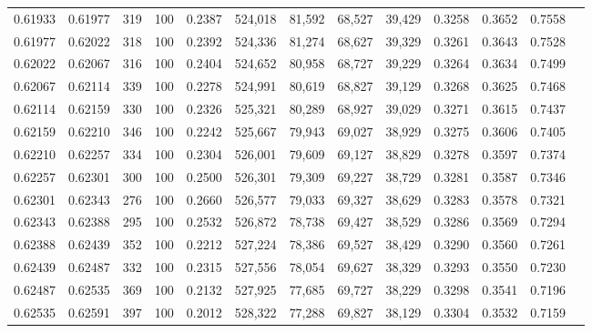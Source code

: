 \begin{tabular}{rrrrrrrrrrrrr}
0.61933 & 0.61977 &   319 & 100 &                                     0.2387 & 524,018 &  81,592 &  68,527 &  39,429 & 0.3258 & 0.3652 & 0.7558 \\
0.61977 & 0.62022 &   318 & 100 &                                     0.2392 & 524,336 &  81,274 &  68,627 &  39,329 & 0.3261 & 0.3643 & 0.7528 \\
0.62022 & 0.62067 &   316 & 100 &                                     0.2404 & 524,652 &  80,958 &  68,727 &  39,229 & 0.3264 & 0.3634 & 0.7499 \\
0.62067 & 0.62114 &   339 & 100 &                                     0.2278 & 524,991 &  80,619 &  68,827 &  39,129 & 0.3268 & 0.3625 & 0.7468 \\
0.62114 & 0.62159 &   330 & 100 &                                     0.2326 & 525,321 &  80,289 &  68,927 &  39,029 & 0.3271 & 0.3615 & 0.7437 \\
0.62159 & 0.62210 &   346 & 100 &                                     0.2242 & 525,667 &  79,943 &  69,027 &  38,929 & 0.3275 & 0.3606 & 0.7405 \\
0.62210 & 0.62257 &   334 & 100 &                                     0.2304 & 526,001 &  79,609 &  69,127 &  38,829 & 0.3278 & 0.3597 & 0.7374 \\
0.62257 & 0.62301 &   300 & 100 &                                     0.2500 & 526,301 &  79,309 &  69,227 &  38,729 & 0.3281 & 0.3587 & 0.7346 \\
0.62301 & 0.62343 &   276 & 100 &                                     0.2660 & 526,577 &  79,033 &  69,327 &  38,629 & 0.3283 & 0.3578 & 0.7321 \\
0.62343 & 0.62388 &   295 & 100 &                                     0.2532 & 526,872 &  78,738 &  69,427 &  38,529 & 0.3286 & 0.3569 & 0.7294 \\
0.62388 & 0.62439 &   352 & 100 &                                     0.2212 & 527,224 &  78,386 &  69,527 &  38,429 & 0.3290 & 0.3560 & 0.7261 \\
0.62439 & 0.62487 &   332 & 100 &                                     0.2315 & 527,556 &  78,054 &  69,627 &  38,329 & 0.3293 & 0.3550 & 0.7230 \\
0.62487 & 0.62535 &   369 & 100 &                                     0.2132 & 527,925 &  77,685 &  69,727 &  38,229 & 0.3298 & 0.3541 & 0.7196 \\
0.62535 & 0.62591 &   397 & 100 &                                     0.2012 & 528,322 &  77,288 &  69,827 &  38,129 & 0.3304 & 0.3532 & 0.7159 \\

\end{tabular}
